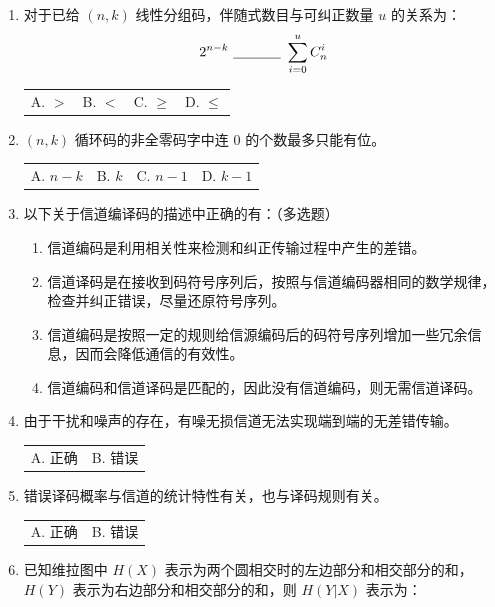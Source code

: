 \documentclass[UTF8,a4paper,12pt]{ctexart}
\newcommand{\blank}[1][3cm]{\underline{\hspace{#1}}}
\begin{document}
\begin{enumerate}[label=\arabic*., leftmargin=2em, itemsep=1.4em]

\item 对于已给 $(n,k)$ 线性分组码，伴随式数目与可纠正数量 $u$ 的关系为：
\[
2^{n-k}\ \blank[1.2cm]\ \sum_{i=0}^{u} C_n^i
\]

\begin{tabular}{@{}p{}p{}p{}p{}@{}}
A. $>$ & B. $<$ & C. $\geq$ & D. $\leq$
\end{tabular}

\item $(n,k)$ 循环码的非全零码字中连 $0$ 的个数最多只能有\blank[1.5cm]位。

\begin{tabular}{@{}p{}p{}p{}p{}@{}}
A. $n-k$ & B. $k$ & C. $n-1$ & D. $k-1$
\end{tabular}

\item 以下关于信道编译码的描述中正确的有：（多选题）

\begin{enumerate}[label=\Alph*. , leftmargin=2em, itemsep=0.4em]
\item 信道编码是利用相关性来检测和纠正传输过程中产生的差错。
\item 信道译码是在接收到码符号序列后，按照与信道编码器相同的数学规律，检查并纠正错误，尽量还原符号序列。
\item 信道编码是按照一定的规则给信源编码后的码符号序列增加一些冗余信息，因而会降低通信的有效性。
\item 信道编码和信道译码是匹配的，因此没有信道编码，则无需信道译码。
\end{enumerate}

\item 由于干扰和噪声的存在，有噪无损信道无法实现端到端的无差错传输。

\begin{tabular}{@{}p{}p{}@{}}
A. 正确 & B. 错误
\end{tabular}

\item 错误译码概率与信道的统计特性有关，也与译码规则有关。

\begin{tabular}{@{}p{}p{}@{}}
A. 正确 & B. 错误
\end{tabular}

\item 已知维拉图中 $H(X)$ 表示为两个圆相交时的左边部分和相交部分的和，$H(Y)$ 表示为右边部分和相交部分的和，则 $H(Y|X)$ 表示为：


\end{enumerate}
\end{document}
